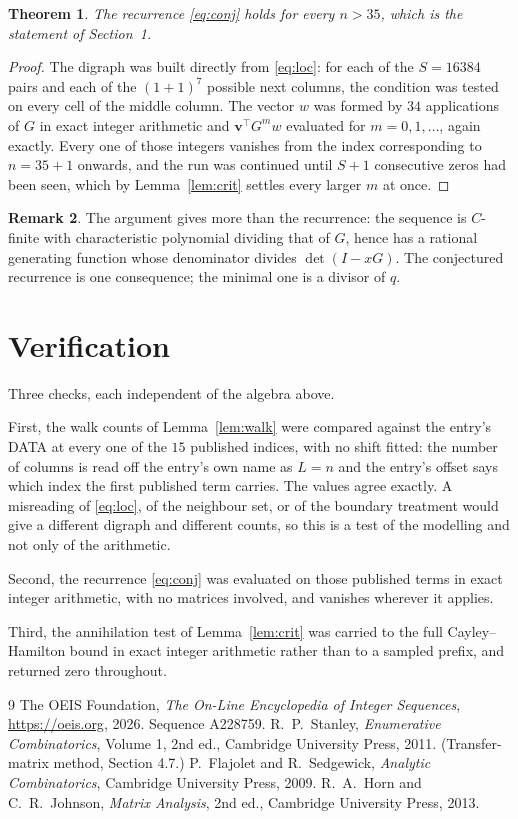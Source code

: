 \documentclass[11pt,a4paper]{article}
\theoremstyle{plain}
\newtheorem{theorem}{Theorem}
\theoremstyle{definition}
\newtheorem{remark}[theorem]{Remark}
\begin{document}
\begin{theorem}
The recurrence \eqref{eq:conj} holds for every $n>35$, which is the statement of
Section~1.
\end{theorem}

\begin{proof}
The digraph was built directly from \eqref{eq:loc}: for each of the $S=16384$ pairs and each
of the $(1+1)^{7}$ possible next columns, the condition was tested on every cell of
the middle column. The vector $w$ was formed by $34$ applications of $G$ in exact integer
arithmetic and $\mathbf{v}^{\!\top}G^{m}w$ evaluated for $m=0,1,\dots$, again exactly.
Every one of those integers vanishes from the index corresponding to $n=35+1$ onwards,
and the run was continued until $S+1$ consecutive zeros had been seen, which by
Lemma~\ref{lem:crit} settles every larger $m$ at once.
\end{proof}

\begin{remark}
The argument gives more than the recurrence: the sequence is $C$-finite with characteristic
polynomial dividing that of $G$, hence has a rational generating function whose denominator
divides $\det(I-xG)$. The conjectured recurrence is one consequence; the minimal one is a
divisor of $q$.
\end{remark}

\section{Verification}

Three checks, each independent of the algebra above.

First, the walk counts of Lemma~\ref{lem:walk} were compared against the entry's DATA at
every one of the $15$ published indices, with no shift fitted: the number of columns is
read off the entry's own name as $L=n$ and the entry's offset says which index the first
published term carries. The values agree exactly. A misreading of \eqref{eq:loc}, of the
neighbour set, or of the boundary treatment would give a different digraph and different
counts, so this is a test of the modelling and not only of the arithmetic.

Second, the recurrence \eqref{eq:conj} was evaluated on those published terms in exact
integer arithmetic, with no matrices involved, and vanishes wherever it applies.

Third, the annihilation test of Lemma~\ref{lem:crit} was carried to the full
Cayley--Hamilton bound in exact integer arithmetic rather than to a sampled prefix, and
returned zero throughout.

\begin{thebibliography}{9}
 The OEIS Foundation, \emph{The On-Line Encyclopedia of Integer
Sequences}, \url{https://oeis.org}, 2026. Sequence A228759.
 R.~P.~Stanley, \emph{Enumerative Combinatorics}, Volume 1, 2nd ed.,
Cambridge University Press, 2011. (Transfer-matrix method, Section 4.7.)
 P.~Flajolet and R.~Sedgewick, \emph{Analytic Combinatorics}, Cambridge
University Press, 2009.
 R.~A.~Horn and C.~R.~Johnson, \emph{Matrix Analysis}, 2nd ed., Cambridge
University Press, 2013.
\end{thebibliography}
\end{document}
